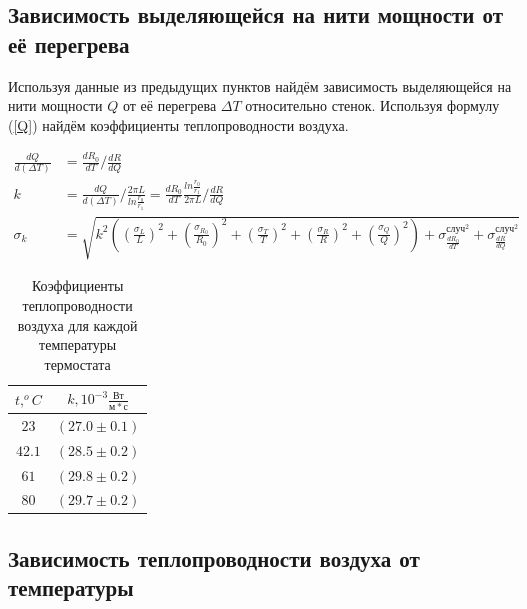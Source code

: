 \documentclass[a4paper, 12pt]{article}
\begin{document}
        \subsection{Зависимость выделяющейся на нити мощности от её перегрева}

            Используя данные из предыдущих пунктов найдём зависимость выделяющейся на нити мощности $Q$ от её перегрева $\Delta T$ относительно стенок. Используя формулу (\ref{Q}) найдём коэффициенты теплопроводности воздуха.

            \begin{align*}
                \frac{dQ}{d(\Delta T)} &= \frac{dR_0}{dT} / \frac{dR}{dQ} \\
                k &= \frac{dQ}{d(\Delta T)} / \frac{2 \pi L}{ln \frac{r_0}{r_1}} = \frac{dR_0}{dT} \frac{ln \frac{r_0}{r_1}}{2 \pi L} / \frac{dR}{dQ}\\
                \sigma_k &= \sqrt{k^2 \left( \left( \frac{\sigma_L}{L} \right)^2 + \left( \frac{\sigma_{R_0}}{R_0} \right)^2 + \left( \frac{\sigma_T}{T} \right)^2 + \left( \frac{\sigma_R}{R} \right)^2 + \left( \frac{\sigma_Q}{Q} \right)^2 \right) + \sigma_{\frac{dR_0}{dT}}^{случ^2} + \sigma_{\frac{dR}{dQ}}^{случ^2}}
            \end{align*}

            \begin{table}[!ht]
                \centering
                \begin{tabular}{|c|c|}
                    \hline

                    $t, ^oC$ & $k, 10^{-3}\frac{Вт}{м * с}$\\ \hline
                    $23$ & $(27.0 \pm 0.1)$\\ \hline
                    $42.1$ & $(28.5 \pm 0.2)$\\ \hline
                    $61$ & $(29.8 \pm 0.2)$\\ \hline
                    $80$ & $(29.7 \pm 0.2)$\\ \hline

                \end{tabular}
                \caption{Коэффициенты теплопроводности воздуха для каждой температуры термостата}
                \label{k_table}
            \end{table}

        \subsection{Зависимость теплопроводности воздуха от температуры}
\end{document}
